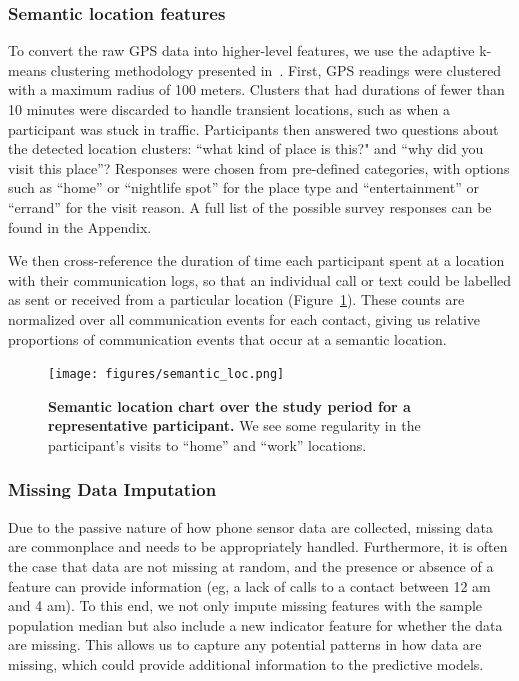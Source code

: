 \documentclass[acmlarge]{acmart}
\begin{document}
\subsubsection*{Semantic location features}

To convert the raw GPS data into higher-level features, we use the adaptive k-means clustering methodology presented in~\cite{saeb2017mobile}. First, GPS readings were clustered with a maximum radius of 100 meters. Clusters that had durations of fewer than 10 minutes were discarded to handle transient locations, such as when a participant was stuck in traffic. Participants then answered two questions about the detected location clusters: ``what kind of place is this?" and ``why did you visit this place''? Responses were chosen from pre-defined categories, with options such as ``home'' or ``nightlife spot'' for the place type and ``entertainment'' or ``errand'' for the visit reason. A full list of the possible survey responses can be found in the Appendix. %

We then cross-reference the duration of time each participant spent at a location with their communication logs, so that an individual call or text could be labelled as sent or received from a particular location (Figure~\ref{fig:semantic_location}). These counts are normalized over all communication events for each contact, giving us relative proportions of communication events that occur at a semantic location.

\begin{figure}
    \centering
    \texttt{[image: figures/semantic\_loc.png]}
    \caption{\textbf{Semantic location chart over the study period for a representative participant.} We see some regularity in the participant's visits to ``home'' and ``work'' locations. }
    \label{fig:semantic_location}
\end{figure}

\subsubsection*{Missing Data Imputation}

Due to the passive nature of how phone sensor data are collected, missing data are commonplace and needs to be appropriately handled. Furthermore, it is often the case that data are not missing at random, and the presence or absence of a feature can provide information (eg, a lack of calls to a contact between 12 am and 4 am). To this end, we not only impute missing features with the sample population median but also include a new indicator feature for whether the data are missing. This allows us to capture any potential patterns in how data are missing, which could provide additional information to the predictive models.
\end{document}
